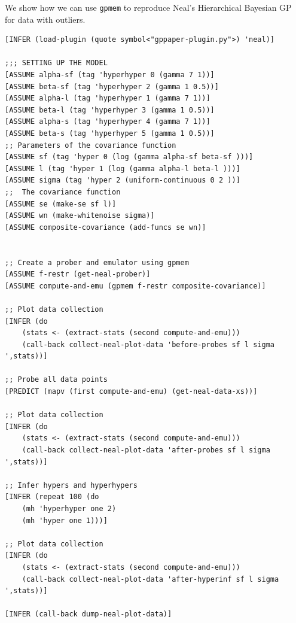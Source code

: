 \documentclass[a0,portrait]{a0poster}
\begin{document}
\begin{multicols}{2}
We show how we can use  {\tt gpmem} to reproduce Neal's Hierarchical Bayesian GP~\cite{neal1997monte} for data with outliers.
\begin{minipage}{\linewidth}
\footnotesize
\belowcaptionskip=-10pt
\begin{lstlisting}[frame=single,caption=Hierarchical  GP Smoothing,mathescape,label=alg:gphierarch]
[INFER (load-plugin (quote symbol<"gppaper-plugin.py">) 'neal)]

;;; SETTING UP THE MODEL
[ASSUME alpha-sf (tag 'hyperhyper 0 (gamma 7 1))]
[ASSUME beta-sf (tag 'hyperhyper 2 (gamma 1 0.5))]
[ASSUME alpha-l (tag 'hyperhyper 1 (gamma 7 1))]
[ASSUME beta-l (tag 'hyperhyper 3 (gamma 1 0.5))]
[ASSUME alpha-s (tag 'hyperhyper 4 (gamma 7 1))]
[ASSUME beta-s (tag 'hyperhyper 5 (gamma 1 0.5))]
;; Parameters of the covariance function
[ASSUME sf (tag 'hyper 0 (log (gamma alpha-sf beta-sf )))]
[ASSUME l (tag 'hyper 1 (log (gamma alpha-l beta-l )))]
[ASSUME sigma (tag 'hyper 2 (uniform-continuous 0 2 ))]
;;  The covariance function
[ASSUME se (make-se sf l)]
[ASSUME wn (make-whitenoise sigma)]
[ASSUME composite-covariance (add-funcs se wn)]


;; Create a prober and emulator using gpmem
[ASSUME f-restr (get-neal-prober)]
[ASSUME compute-and-emu (gpmem f-restr composite-covariance)]

;; Plot data collection
[INFER (do
    (stats <- (extract-stats (second compute-and-emu)))
    (call-back collect-neal-plot-data 'before-probes sf l sigma ',stats))]

;; Probe all data points
[PREDICT (mapv (first compute-and-emu) (get-neal-data-xs))]

;; Plot data collection
[INFER (do
    (stats <- (extract-stats (second compute-and-emu)))
    (call-back collect-neal-plot-data 'after-probes sf l sigma ',stats))]

;; Infer hypers and hyperhypers
[INFER (repeat 100 (do
    (mh 'hyperhyper one 2)
    (mh 'hyper one 1)))]

;; Plot data collection
[INFER (do
    (stats <- (extract-stats (second compute-and-emu)))
    (call-back collect-neal-plot-data 'after-hyperinf sf l sigma ',stats))]

[INFER (call-back dump-neal-plot-data)]

\end{lstlisting}
\end{minipage}


\end{multicols}
\end{document}
